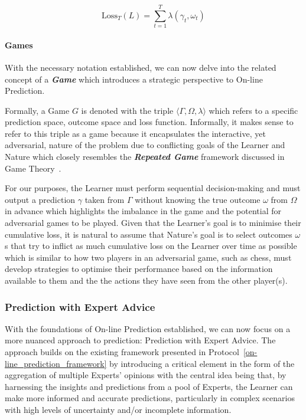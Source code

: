 \begin{equation}
    \text{Loss}_T(L) = \underset{t=1}{\overset{T}{\sum}} \lambda(\gamma_t, \omega_t)
\end{equation}

\paragraph{Games}\label{paragraph:games}
With the necessary notation established, we can now delve into the related concept of a \textbf{\textit{Game}} which introduces a strategic perspective to On-line Prediction.

Formally, a Game $G$ is denoted with the triple $\langle \Gamma, \Omega, \lambda \rangle$ which refers to a specific prediction space, outcome space and loss function. Informally, it makes sense to refer to this triple as a game because it encapsulates the interactive, yet adversarial, nature of the problem due to conflicting goals of the Learner and Nature which closely resembles the \textbf{\textit{Repeated Game}} framework discussed in Game Theory~\cite{mertens:1990}.

For our purposes, the Learner must perform sequential decision-making and must output a prediction $\gamma$ taken from $\Gamma$ without knowing the true outcome $\omega$ from $\Omega$ in advance which highlights the imbalance in the game and the potential for adversarial games to be played. Given that the Learner's goal is to minimise their cumulative loss, it is natural to assume that Nature's goal is to select outcomes $\omega$s that try to inflict as much cumulative loss on the Learner over time as possible which is similar to how two players in an adversarial game, such as chess, must develop strategies to optimise their performance based on the information available to them and the the actions they have seen from the other player(s).

\subsubsection{Prediction with Expert Advice}\label{subsubsection:prediction_with_expert_advice}
With the foundations of On-line Prediction established, we can now focus on a more nuanced approach to prediction: Prediction with Expert Advice. The approach builds on the existing framework presented in Protocol~\ref{on-line_prediction_framework} by introducing a critical element in the form of the aggregation of multiple Experts' opinions with the central idea being that, by harnessing the insights and predictions from a pool of Experts, the Learner can make more informed and accurate predictions, particularly in complex scenarios with high levels of uncertainty and/or incomplete information.

